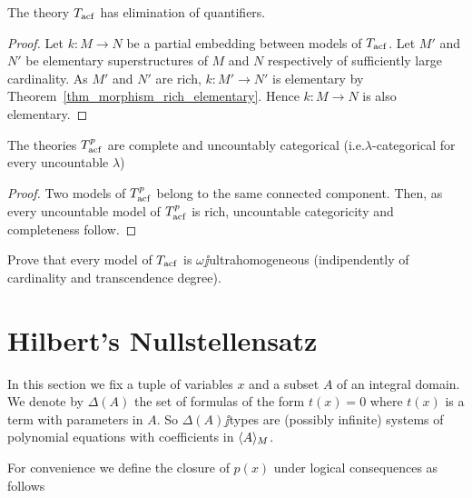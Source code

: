 \documentclass[creche.tex]{subfiles}
\begin{document}
\begin{corollary}\label{corol_acfUltraOmog}
The theory $T_{\rm acf}$ has elimination of quantifiers.
\end{corollary}
\begin{proof}
Let $k:M\to N$ be a partial embedding between models of $T_{\rm acf}$. Let $M'$ and $N'$ be elementary superstructures of $M$ and $N$ respectively of sufficiently large cardinality. As $M'$ and $N'$ are rich, $k:M'\to N'$ is elementary by Theorem~\ref{thm_morphism_rich_elementary}. Hence $k:M\to N$ is also elementary.
\end{proof}



\begin{corollary}\label{corol_acfUltraOmog}
The theories $T^p_{\rm acf}$ are complete and uncountably categorical (i.e.\@ $\lambda$-categorical for every uncountable $\lambda$)
\end{corollary}
\begin{proof}
Two models of $T^p_{\rm acf}$ belong to the same connected component. Then, as every uncountable model of $T^p_{\rm acf}$ is rich, uncountable categoricity and completeness follow.
\end{proof}


\begin{exercise}
Prove that every model of $T_{\rm acf}$ is $\omega\jj$ultrahomogeneous (indipendently of cardinality and transcendence degree).\QED
\end{exercise}


\section{Hilbert's Nullstellensatz}
\label{Nullstellensatz}

\def\medrel#1{\parbox{5ex}{\hfil$\displaystyle #1$}}
\def\ceq#1#2#3{\parbox{20ex}{$\displaystyle #1$}\medrel{#2}$\displaystyle  #3$}

In this section we fix a tuple of variables \emph{$x$\/} and a subset \emph{$A$} of an integral domain. We denote by \emph{$\Delta(A)$\/} the set of formulas of the form $t(x)=0$ where $t(x)$ is a term with parameters in $A$. So $\Delta(A)\jj$types are (possibly infinite) systems of polynomial equations with coefficients in $\langle A\rangle_M$. 

For convenience we define the closure of $p(x)$ under logical consequences as follows
\end{document}

